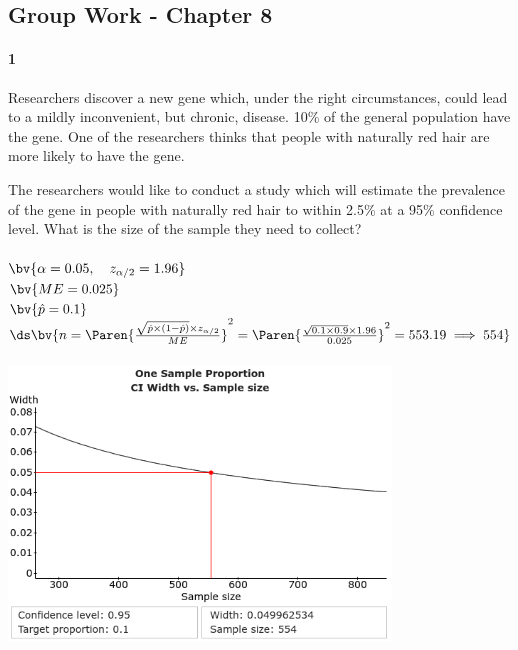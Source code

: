 \documentclass{article}
\begin{document}
\begin{flushleft}
\section*{Group Work - Chapter 8}
\paragraph{1} Researchers discover a new gene which, under the right circumstances, could lead to a mildly inconvenient, but chronic, disease. 10\% of the general population have the gene. One of the researchers thinks that people with naturally red hair are more likely to have the gene.
\begin{enumalpha}
\item The researchers would like to conduct a study which will estimate the prevalence of the gene in people with naturally red hair to within 2.5\% at a 95\% confidence level. What is the size of the sample they need to collect?\\
\medskip
{}\\
$\bv{\alpha = 0.05, \quad z_{\alpha/2} = 1.96}$\\
$\bv{ME = 0.025}$\\
$\bv{\hat p = 0.1}$\\ \bigskip
$\ds \bv{n = \Paren{\frac{\sqrt{\hat p \times (1-\hat p)} \times z_{\alpha/2}}{ME}}^2 = \Paren{\frac{\sqrt{0.1 \times 0.9} \times 1.96}{0.025}}^2 = 553.19 \implies 554}$\\
\vspace{0.5in}
\\
\includegraphics[width=4in]{images/grp08_Q1_a}


\end{enumalpha}
\end{flushleft}
\end{document}
